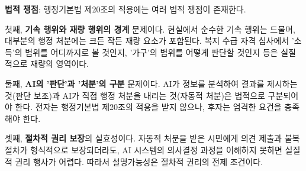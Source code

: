 \textbf{법적 쟁점}: 행정기본법 제20조의 적용에는 여러 법적 쟁점이 존재한다.

첫째, \textbf{기속 행위와 재량 행위의 경계} 문제이다. 현실에서 순수한 기속 행위는 드물며, 대부분의 행정 처분에는 크든 작든 재량 요소가 포함된다. 복지 수급 자격 심사에서 '소득'의 범위를 어디까지로 볼 것인지, '가구'의 범위를 어떻게 판단할 것인지 등은 실질적으로 재량의 영역이다.

둘째, \textbf{AI의 '판단'과 '처분'의 구분} 문제이다. AI가 정보를 분석하여 결과를 제시하는 것(판단 보조)과 AI가 직접 행정 처분을 내리는 것(자동적 처분)은 법적으로 구분되어야 한다. 전자는 행정기본법 제20조의 적용을 받지 않으나, 후자는 엄격한 요건을 충족해야 한다.

셋째, \textbf{절차적 권리 보장}의 실효성이다. 자동적 처분을 받은 시민에게 의견 제출과 불복 절차가 형식적으로 보장되더라도, AI 시스템의 의사결정 과정을 이해하지 못하면 실질적 권리 행사가 어렵다. 따라서 설명가능성은 절차적 권리의 전제 조건이다.

